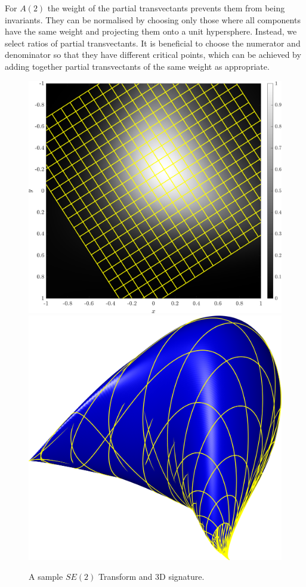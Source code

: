 \documentclass[review,onefignum,onetabnum]{siamonline190516}
\begin{document}
{For $A(2)$ the weight of the partial transvectants prevents them from being invariants. They can be normalised by choosing only those where all components have the same weight and projecting them onto a unit hypersphere. Instead, we select ratios of partial transvectants. It is beneficial to choose the numerator and denominator so that they have different critical points, which can be achieved by adding together partial transvectants of the same weight as appropriate.

\begin{figure}
\centering
\includegraphics[width=.45\textwidth]{Figs/f_transformed_SE2.png}
\includegraphics[width=.45\textwidth]{Figs/SE2_signature.png}
\caption{A sample $SE(2)$ Transform and 3D signature.}
\label{fig:SE2}
\end{figure}

}
\end{document}
